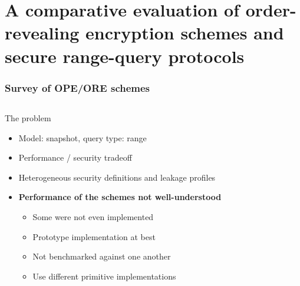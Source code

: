 \section{A comparative evaluation of order-revealing encryption schemes and secure range-query protocols~\cite{ore-benchmark-17}}

	\begin{frame}[label={frame:ore}]

		\frametitle{Survey of OPE/ORE schemes~\cite{ore-benchmark-17}}

		\begin{columns}[T,onlytextwidth]

				\begin{block}{The problem}

					\begin{itemize}
						\item Model: \alert{snapshot}, query type: \alert{range}
						\item Performance / security tradeoff
						\item Heterogeneous security definitions and leakage profiles
						\item \textbf{Performance of the schemes not well-understood}
						\begin{itemize}
							\item Some were not even implemented
							\item Prototype implementation at best
							\item Not benchmarked against one another
							\item Use different primitive implementations
						\end{itemize}
					\end{itemize}

				\end{block}


\end{columns}
\end{frame}
